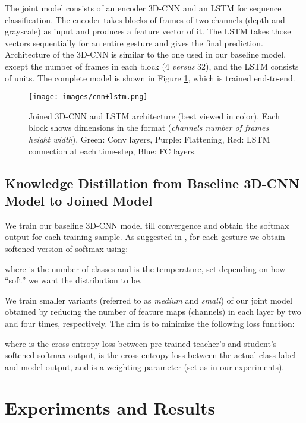 \documentclass{article}
\begin{document}
The joint model consists of an encoder 3D-CNN and an LSTM for sequence classification. The encoder takes blocks of  frames of two channels (depth and grayscale) as input and produces a feature vector of it. The LSTM takes those vectors sequentially for an entire gesture and gives the final prediction. Architecture of the 3D-CNN is similar to the one used in our baseline model, except the number of frames in each block (4 \textit{versus} 32), and the LSTM consists of  units. The complete model is shown in Figure \ref{fig:joined}, which is trained end-to-end.

\begin{figure}
  \texttt{[image: images/cnn+lstm.png]}
  \caption{Joined 3D-CNN and LSTM architecture (best viewed in color). Each block shows dimensions in the format (\textit{channels  number of frames  height  width}). Green: Conv layers, Purple: Flattening, Red: LSTM connection at each time-step, Blue: FC layers.}
  \label{fig:joined}
\end{figure}

\subsection{Knowledge Distillation from Baseline 3D-CNN Model to Joined Model}
\label{ssec:darkknowledge}

We train our baseline 3D-CNN model till convergence and obtain the softmax output for each training sample. As suggested in \cite{dark-knowledge}, for each gesture we obtain softened version of softmax using:

where  is the number of classes and  is the temperature, set depending on how ``soft'' we want the distribution to be.

We train smaller variants (referred to as \textit{medium} and \textit{small}) of our joint model obtained by reducing the number of feature maps (channels) in each layer by two and four times, respectively. The aim is to minimize the following loss function:

where  is the cross-entropy loss between pre-trained teacher's and student's softened softmax output,  is the cross-entropy loss between the actual class label and model output, and  is a weighting parameter (set as  in our experiments).

\section{Experiments and Results}
\label{sec:exp}
\end{document}

